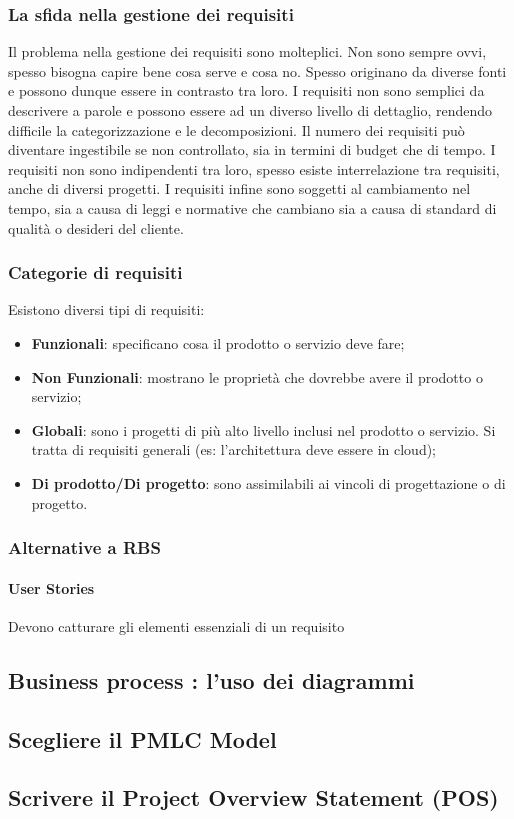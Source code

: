 \subsubsection{La sfida nella gestione dei requisiti}
Il problema nella gestione dei requisiti sono molteplici. Non sono sempre ovvi, spesso bisogna capire bene cosa serve e cosa no. Spesso originano da diverse fonti e possono dunque essere in contrasto tra loro. I requisiti non sono semplici da descrivere a parole e possono essere ad un diverso livello di dettaglio, rendendo difficile la categorizzazione e le decomposizioni. Il numero dei requisiti può diventare ingestibile se non controllato, sia in termini di budget che di tempo. I requisiti non sono indipendenti tra loro, spesso esiste interrelazione tra requisiti, anche di diversi progetti. I requisiti infine sono soggetti al cambiamento nel tempo, sia a causa di leggi e normative che cambiano sia a causa di standard di qualità o desideri del cliente.
\subsubsection{Categorie di requisiti}
Esistono diversi tipi di requisiti:
\begin{itemize}
	\item \textbf{Funzionali}: specificano cosa il prodotto o servizio deve fare;
	\item \textbf{Non Funzionali}: mostrano le proprietà che dovrebbe avere il prodotto o servizio;
	\item \textbf{Globali}: sono i progetti di più alto livello inclusi nel prodotto o servizio. Si tratta di requisiti generali (es: l'architettura deve essere in cloud);
	\item \textbf{Di prodotto/Di progetto}: sono assimilabili ai vincoli di progettazione o di progetto.
\end{itemize}
\subsubsection{Alternative a RBS}
\paragraph{User Stories}
Devono catturare gli elementi essenziali di un requisito
\subsection{Business process : l’uso dei diagrammi}
\subsection{Scegliere il PMLC Model}
\subsection{Scrivere il Project Overview Statement (POS)}
\newpage